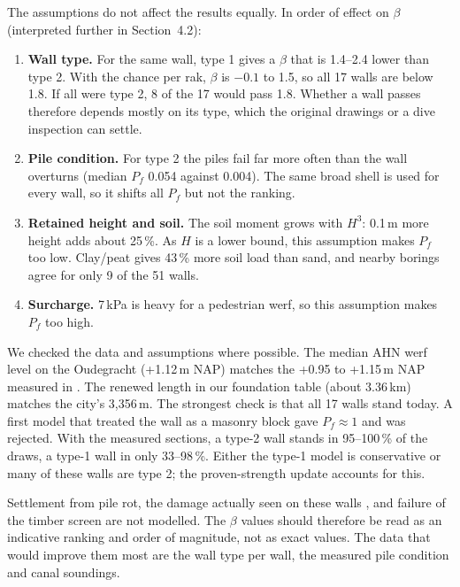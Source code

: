 The assumptions do not affect the results equally. In order of effect on
$\beta$ (interpreted further in Section~4.2):
\begin{enumerate}\setlength{\itemsep}{0pt}\setlength{\parskip}{0pt}
  \item \textbf{Wall type.} For the same wall, type 1 gives a $\beta$ that is
    1.4--2.4 lower than type 2. With the chance per rak, $\beta$ is
    $-0.1$ to 1.5, so all 17 walls are below 1.8. If all were type 2, 8 of
    the 17 would pass 1.8. Whether a wall passes therefore depends mostly on its type, which the
    original drawings or a dive inspection can settle.
  \item \textbf{Pile condition.} For type 2 the piles fail far more often than
    the wall overturns (median $P_f$ 0.054 against 0.004). The same broad
    shell is used for every wall, so it shifts all $P_f$ but not the ranking.
  \item \textbf{Retained height and soil.} The soil moment grows with $H^3$:
    0.1\,m more height adds about 25\,\%. As $H$ is a lower bound, this
    assumption makes $P_f$ too low. Clay/peat gives 43\,\% more soil load than
    sand, and nearby borings agree for only 9 of the 51 walls.
  \item \textbf{Surcharge.} 7\,kPa is heavy for a pedestrian werf, so this
    assumption makes $P_f$ too high.
\end{enumerate}

We checked the data and assumptions where possible. The median AHN werf level
on the Oudegracht (+1.12\,m NAP) matches the +0.95 to +1.15\,m NAP measured in
\cite{erfgoed156,erfgoed158}. The renewed length in our foundation table
(about 3.36\,km) matches the city's 3{,}356\,m. The strongest check is that all
17 walls stand today. A first model that treated the wall as a masonry block
gave $P_f \approx 1$ and was rejected. With the measured sections, a type-2
wall stands in 95--100\,\% of the draws, a type-1 wall in only 33--98\,\%.
Either the type-1 model is conservative or many of these walls are type 2; the
proven-strength update accounts for this.

Settlement from pile rot, the damage actually seen on these walls
\cite{erfgoed156}, and failure of the timber screen are not modelled. The
$\beta$ values should therefore be read as an indicative ranking and order of
magnitude, not as exact values. The data that would improve them most are the
wall type per wall, the measured pile condition and canal soundings.

